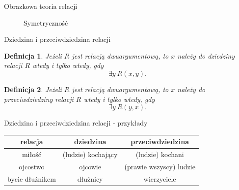 \documentclass{beamer}
\newtheorem{definicja}{Definicja}
\begin{document}
\begin{frame}{Obrazkowa teoria relacji}
\begin{center}
{\begin{figure}
\caption{Symetryczność}
\end{figure}
}
\end{center}
\end{frame}



\begin{frame}{Dziedzina i przeciwdziedzina relacji}
%
\begin{definicja}
Jeżeli $R$ jest relacją dwuargumentową, to $x$ należy do \emph{dziedziny} relacji $R$ wtedy i tylko wtedy, gdy $$\exists y~ R(x, y).$$
\end{definicja}
%
\begin{definicja}
Jeżeli $R$ jest relacją dwuargumentową, to $x$ należy do \emph{przeciwdziedziny} relacji $R$ wtedy i tylko wtedy, gdy $$\exists y~ R(y, x).$$
\end{definicja}
\end{frame}

\begin{frame}{Dziedzina i przeciwdziedzina relacji - przykłady}
%
\begin{center}
\begin{table}
{\small
\begin{tabular}{|c|c|c|}
\hline
\textbf{relacja} & \textbf{dziedzina} & \textbf{przeciwdziedzina} \\
\hline
miłość & (ludzie) kochający & (ludzie) kochani\\
\hline
ojcostwo & ojcowie & (prawie wszyscy) ludzie \\
\hline
bycie dłużnikem & dłużnicy & wierzyciele \\
\hline
\end{tabular}
}
\end{table}
\end{center}
\end{frame}
\end{document}
